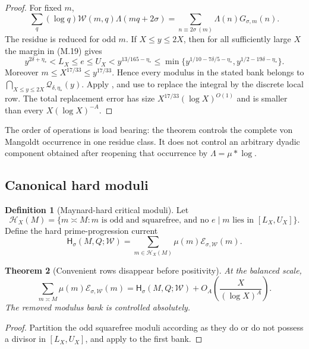 \documentclass[11pt]{article}
\newtheorem{theorem}{Theorem}[section]
\theoremstyle{definition}
\newtheorem{definition}[theorem]{Definition}
\theoremstyle{remark}
\begin{document}
\begin{proof}
For fixed $m$,
\[
 \sum_q(\log q)\mathscr W(m,q)\Lambda(mq+2\sigma)
 =\sum_{n\equiv2\sigma\ (m)}\Lambda(n)G_{\sigma,m}(n).
\]
The residue is reduced for odd $m$.  If $X\le y\le2X$, then for all
sufficiently large $X$ the margin in \textup{(M.19)} gives
\[
 y^{2\delta+\eta_*}<L_X\le e\le U_X
 <y^{13/165-\eta_*}
 \le
 \min\{y^{1/10-7\delta/5-\eta_*},
          y^{1/2-19\delta-\eta_*}\}.
\]
Moreover $m\le X^{17/33}\le y^{17/33}$.  Hence every modulus in the
stated bank belongs to
$\bigcap_{X\le y\le2X}\mathscr Q_{\delta,\eta_*}(y)$.
Apply , and use
 to replace the integral by the discrete local
row.  The total replacement error has size $X^{17/33}(\log X)^{O(1)}$ and is smaller
than every $X(\log X)^{-A}$.
\end{proof}

The order of operations is load bearing: the theorem controls the complete
von Mangoldt occurrence in one residue class.  It does not control an
arbitrary dyadic component obtained after reopening that occurrence by
$\Lambda=\mu*\log$.

\subsection{Canonical hard moduli}

\begin{definition}[Maynard-hard critical moduli]
\label{def:hard-moduli}
Let
\[
 \boxed{
 \mathscr H_X(M)
 =\{m\asymp M:
   m\text{ is odd and squarefree, and no }e\mid m
   \text{ lies in }[L_X,U_X]\}.}
 \tag{M.23}
\]
Define the hard prime-progression current
\[
 \boxed{
 \mathsf H_{\sigma}(M,Q;\mathscr W)
 =\sum_{m\in\mathscr H_X(M)}
   \mu(m)\mathcal E_{\sigma,\mathscr W}(m).}
 \tag{M.24}
\]
\end{definition}

\begin{theorem}[Convenient rows disappear before positivity]
\label{thm:hard-prime-reduction}
At the balanced scale,
\[
 \boxed{
 \sum_{m\asymp M}\mu(m)\mathcal E_{\sigma,\mathscr W}(m)
 =\mathsf H_{\sigma}(M,Q;\mathscr W)
  +O_A\!\left(\frac{X}{(\log X)^A}\right).}
 \tag{M.25}
\]
The removed modulus bank is controlled absolutely.
\end{theorem}

\begin{proof}
Partition the odd squarefree moduli according as they do or do not possess a
divisor in $[L_X,U_X]$, and apply
 to the first bank.
\end{proof}
\end{document}
